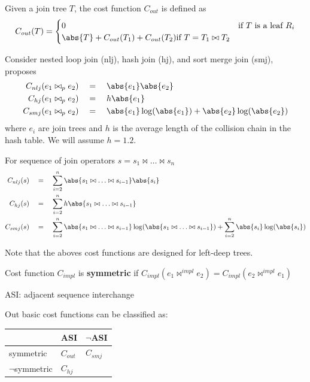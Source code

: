 \documentclass[11pt]{article}
\begin{document}
Given a join tree \(T\), the cost function \(C_{out}\) is defined as
\begin{equation*}
C_{out}(T)=
\begin{cases}
0&\text{if $T$ is a leaf }R_i\\
\abs{T}+C_{out}(T_1)+C_{out}(T_2)\text{if }T=T_1\bowtie T_2
\end{cases}
\end{equation*}

Consider nested loop join (nlj), hash join (hj), and sort merge join (smj),
\cite{10.5555/645913.671481} proposes
\begin{align*}
C_{nlj}(e_1\bowtie_pe_2)&\quad=\quad\abs{e_1}\abs{e_2}\\
C_{hj}(e_1\bowtie_pe_2)&\quad=\quad h\abs{e_1}\\
C_{smj}(e_1\bowtie_pe_2)&\quad=\quad\abs{e_1}\log(\abs{e_1})+\abs{e_2}\log(\abs{e_2})
\end{align*}
where \(e_i\) are join trees and \(h\) is the average length of the collision chain in the hash table. We
will assume \(h=1.2\).

For sequence of join operators \(s=s_1\bowtie\dots\bowtie s_n\)
\begin{align*}
C_{nlj}(s)&\quad=\quad\sum_{i=2}^n\abs{s_1\bowtie\dots\bowtie s_{i-1}}\abs{s_i}\\
C_{hj}(s)&\quad=\quad\sum_{i=2}^nh\abs{s_1\bowtie\dots\bowtie s_{i-1}}\\
C_{smj}(s)&\quad=\quad\sum_{i=2}^n\abs{s_1\bowtie\dots\bowtie s_{i-1}}\log(\abs{s_1\bowtie\dots\bowtie s_{i-1}})+\sum_{i=2}^n\abs{s_i}\log(\abs{s_i})
\end{align*}
\begin{remark}[]
Note that the aboves cost functions are designed for left-deep trees.
\end{remark}

Cost function \(C_{impl}\) is \textbf{symmetric} if \(C_{impl}(e_{1}\bowtie^{impl}e_2)=C_{impl}(e_2\bowtie^{impl}e_1)\)

ASI: adjacent sequence interchange

Out basic cost functions can be classified as:
\begin{center}
\begin{tabular}{lll}
 & ASI & \(\neg\)ASI\\[0pt]
\hline
symmetric & \(C_{out}\) & \(C_{smj}\)\\[0pt]
\(\neg\)symmetric & \(C_{hj}\) & \\[0pt]
\end{tabular}
\end{center}
\end{document}
